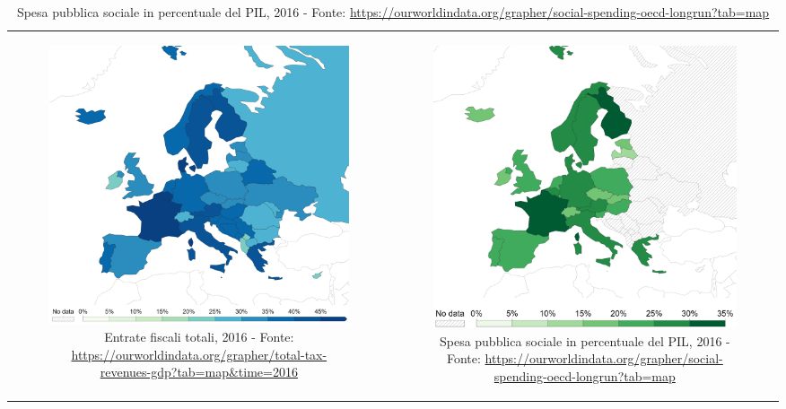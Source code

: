 \documentclass[12pt]{book} %
\begin{document}
\begin{table}[H]
\centering
\caption{Possiamo notare una correlazione tra tasse e welfare. Le mappe sono focalizzate solo sull'Europa in quanto nel resto del mondo non si hanno dati, come potete constatare entrando nella fonte. Inoltre la testa della classifica è composta da stati europei: 1° Francia, 2° Finlandia 3° Belgio 4° Italia, 5° Danimarca, il Giappone si trova in 11° posizione, Nuova Zelanda 21° e Stati Uniti al 23.}
\begin{tabular}{cc}
  \begin{subfigure}{0.5\textwidth}
    \centering
    \includegraphics[width=0.8\linewidth]{images/Libro-img028.png}
    \caption{Entrate fiscali totali, 2016 - Fonte: \protect\url{https://ourworldindata.org/grapher/total-tax-revenues-gdp?tab=map\&time=2016}}
  \end{subfigure}
  &
  \begin{subfigure}{0.5\textwidth}
    \centering
    \includegraphics[width=0.8\linewidth]{images/Libro-img029.png}
    \caption{Spesa pubblica sociale in percentuale del PIL, 2016 - Fonte: \protect\url{https://ourworldindata.org/grapher/social-spending-oecd-longrun?tab=map}}
  \end{subfigure}
\end{tabular}
\end{table}
\end{document}
